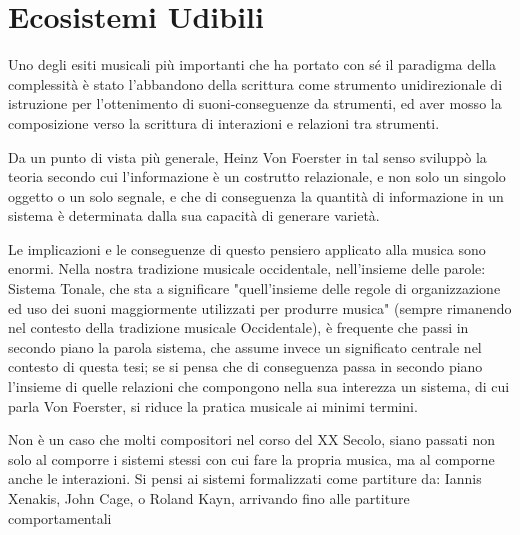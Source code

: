 
\section{Ecosistemi Udibili}
\label{sec:Ecosistemi Udibili}

Uno degli esiti musicali più importanti che ha portato con sé il paradigma della complessità è stato l'abbandono della scrittura come strumento unidirezionale di istruzione per l'ottenimento di suoni-conseguenze da strumenti, ed aver mosso la composizione verso la scrittura di interazioni e relazioni tra  strumenti.


Da un punto di vista più generale, Heinz Von Foerster in tal senso 
sviluppò la teoria %
secondo cui l'informazione è un costrutto relazionale, 
e non solo un singolo oggetto o un solo segnale, 
e che di conseguenza la quantità di informazione in un sistema è determinata 
dalla sua capacità di generare varietà.

Le implicazioni e le conseguenze di questo pensiero applicato alla musica sono enormi.
Nella nostra tradizione musicale occidentale, nell'insieme delle parole: Sistema Tonale, 
che sta a significare "quell'insieme delle regole di organizzazione ed uso dei
suoni maggiormente utilizzati per produrre musica" 
(sempre rimanendo nel contesto della tradizione musicale Occidentale), 
è frequente che passi in secondo piano la parola 
sistema, che assume invece un significato centrale nel contesto di questa tesi;
se si pensa che di conseguenza passa in secondo piano l'insieme di quelle relazioni
che compongono nella sua interezza un sistema, di cui parla Von Foerster, 
si riduce la pratica musicale ai minimi termini.

Non è un caso che molti compositori nel corso del XX Secolo, siano passati non solo al comporre 
i sistemi stessi con cui fare la propria musica, ma al comporne anche le interazioni.
Si pensi ai sistemi formalizzati come partiture da: Iannis Xenakis, John Cage, o Roland Kayn,
arrivando fino alle partiture comportamentali



